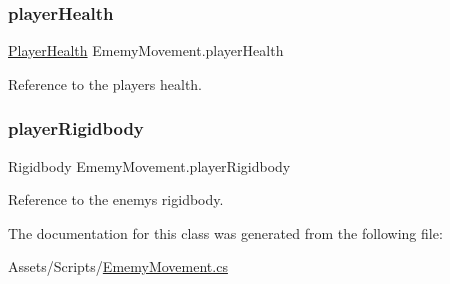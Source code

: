 \subsubsection{\texorpdfstring{playerHealth}{playerHealth}}
{\footnotesize\ttfamily \mbox{\hyperlink{class_player_health}{Player\+Health}} Ememy\+Movement.\+player\+Health\hspace{0.3cm}{\ttfamily [private]}}

Reference to the player\textquotesingle{}s health. \mbox{\label{class_ememy_movement_aeb6b162d771e4a491218d4ac183070f4}} 
\subsubsection{\texorpdfstring{playerRigidbody}{playerRigidbody}}
{\footnotesize\ttfamily Rigidbody Ememy\+Movement.\+player\+Rigidbody\hspace{0.3cm}{\ttfamily [private]}}

Reference to the enemy\textquotesingle{}s rigidbody. 

The documentation for this class was generated from the following file\+:\begin{DoxyCompactItemize}
\item 
Assets/\+Scripts/\mbox{\hyperlink{_ememy_movement_8cs}{Ememy\+Movement.\+cs}}\end{DoxyCompactItemize}
